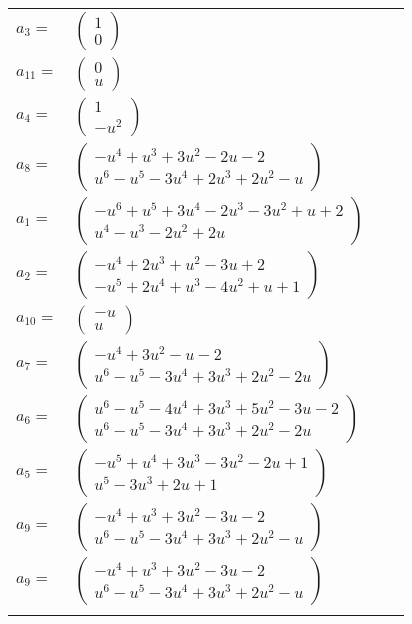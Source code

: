 \documentclass[1p]{elsarticle_modified}
\theoremstyle{definition}
\begin{document}
\begin{tabular}{m{7pt} m{180pt} m{7pt} m{180pt} }
\flushright $a_{3}=$&$\begin{pmatrix}1\\0\end{pmatrix}$ \\
\flushright $a_{11}=$&$\begin{pmatrix}0\\u\end{pmatrix}$ \\
\flushright $a_{4}=$&$\begin{pmatrix}1\\- u^2\end{pmatrix}$ \\
\flushright $a_{8}=$&$\begin{pmatrix}- u^4+u^3+3 u^2-2 u-2\\u^6- u^5-3 u^4+2 u^3+2 u^2- u\end{pmatrix}$ \\
\flushright $a_{1}=$&$\begin{pmatrix}- u^6+u^5+3 u^4-2 u^3-3 u^2+u+2\\u^4- u^3-2 u^2+2 u\end{pmatrix}$ \\
\flushright $a_{2}=$&$\begin{pmatrix}- u^4+2 u^3+u^2-3 u+2\\- u^5+2 u^4+u^3-4 u^2+u+1\end{pmatrix}$ \\
\flushright $a_{10}=$&$\begin{pmatrix}- u\\u\end{pmatrix}$ \\
\flushright $a_{7}=$&$\begin{pmatrix}- u^4+3 u^2- u-2\\u^6- u^5-3 u^4+3 u^3+2 u^2-2 u\end{pmatrix}$ \\
\flushright $a_{6}=$&$\begin{pmatrix}u^6- u^5-4 u^4+3 u^3+5 u^2-3 u-2\\u^6- u^5-3 u^4+3 u^3+2 u^2-2 u\end{pmatrix}$ \\
\flushright $a_{5}=$&$\begin{pmatrix}- u^5+u^4+3 u^3-3 u^2-2 u+1\\u^5-3 u^3+2 u+1\end{pmatrix}$ \\
\flushright $a_{9}=$&$\begin{pmatrix}- u^4+u^3+3 u^2-3 u-2\\u^6- u^5-3 u^4+3 u^3+2 u^2- u\end{pmatrix}$\\ \flushright $a_{9}=$&$\begin{pmatrix}- u^4+u^3+3 u^2-3 u-2\\u^6- u^5-3 u^4+3 u^3+2 u^2- u\end{pmatrix}$\\&\end{tabular}
\end{document}
